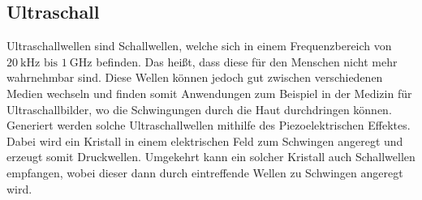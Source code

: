 \subsection{Ultraschall}

    Ultraschallwellen sind Schallwellen, welche sich in einem Frequenzbereich von $\qty{20}{\kilo\hertz} 
    \text{ bis }\qty{1}{\giga\hertz}$ befinden. Das heißt, dass diese für den Menschen nicht mehr wahrnehmbar sind.
    Diese Wellen können jedoch gut zwischen verschiedenen Medien wechseln und finden somit Anwendungen zum Beispiel
    in der Medizin für Ultraschallbilder, wo die Schwingungen durch die Haut durchdringen können.\\
    \noindent Generiert werden solche Ultraschallwellen mithilfe des Piezoelektrischen Effektes. Dabei wird ein
    Kristall in einem elektrischen Feld zum Schwingen angeregt und erzeugt somit Druckwellen. Umgekehrt kann ein solcher
    Kristall auch Schallwellen empfangen, wobei dieser dann durch eintreffende Wellen zu Schwingen angeregt wird.


\cite{VUS3}
